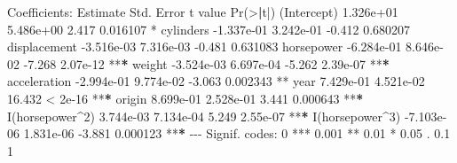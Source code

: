 \documentclass[
]{article}
\newenvironment{Shaded}{\begin{snugshade}}{\end{snugshade}}
\newcommand{\DecValTok}[1]{\textcolor[rgb]{0.00,0.00,0.81}{#1}}
\newcommand{\ErrorTok}[1]{\textcolor[rgb]{0.64,0.00,0.00}{\textbf{#1}}}
\newcommand{\FloatTok}[1]{\textcolor[rgb]{0.00,0.00,0.81}{#1}}
\newcommand{\FunctionTok}[1]{\textcolor[rgb]{0.00,0.00,0.00}{#1}}
\newcommand{\NormalTok}[1]{#1}
\newcommand{\SpecialCharTok}[1]{\textcolor[rgb]{0.00,0.00,0.00}{#1}}
\newcommand{\StringTok}[1]{\textcolor[rgb]{0.31,0.60,0.02}{#1}}
\begin{document}
\begin{Shaded}
\begin{Highlighting}[]
\NormalTok{Coefficients}\SpecialCharTok{:}
\NormalTok{                  Estimate Std. Error t value }\FunctionTok{Pr}\NormalTok{(}\SpecialCharTok{\textgreater{}}\ErrorTok{|}\NormalTok{t}\SpecialCharTok{|}\NormalTok{)    }
\NormalTok{(Intercept)      }\FloatTok{1.326e+01}  \FloatTok{5.486e+00}   \FloatTok{2.417} \FloatTok{0.016107} \SpecialCharTok{*}  
\NormalTok{cylinders       }\SpecialCharTok{{-}}\FloatTok{1.337e{-}01}  \FloatTok{3.242e{-}01}  \SpecialCharTok{{-}}\FloatTok{0.412} \FloatTok{0.680207}    
\NormalTok{displacement    }\SpecialCharTok{{-}}\FloatTok{3.516e{-}03}  \FloatTok{7.316e{-}03}  \SpecialCharTok{{-}}\FloatTok{0.481} \FloatTok{0.631083}    
\NormalTok{horsepower      }\SpecialCharTok{{-}}\FloatTok{6.284e{-}01}  \FloatTok{8.646e{-}02}  \SpecialCharTok{{-}}\FloatTok{7.268} \FloatTok{2.07e{-}12} \SpecialCharTok{**}\ErrorTok{*}
\NormalTok{weight          }\SpecialCharTok{{-}}\FloatTok{3.524e{-}03}  \FloatTok{6.697e{-}04}  \SpecialCharTok{{-}}\FloatTok{5.262} \FloatTok{2.39e{-}07} \SpecialCharTok{**}\ErrorTok{*}
\NormalTok{acceleration    }\SpecialCharTok{{-}}\FloatTok{2.994e{-}01}  \FloatTok{9.774e{-}02}  \SpecialCharTok{{-}}\FloatTok{3.063} \FloatTok{0.002343} \SpecialCharTok{**} 
\NormalTok{year             }\FloatTok{7.429e{-}01}  \FloatTok{4.521e{-}02}  \FloatTok{16.432}  \SpecialCharTok{\textless{}} \FloatTok{2e{-}16} \SpecialCharTok{**}\ErrorTok{*}
\NormalTok{origin           }\FloatTok{8.699e{-}01}  \FloatTok{2.528e{-}01}   \FloatTok{3.441} \FloatTok{0.000643} \SpecialCharTok{**}\ErrorTok{*}
\FunctionTok{I}\NormalTok{(horsepower}\SpecialCharTok{\^{}}\DecValTok{2}\NormalTok{)  }\FloatTok{3.744e{-}03}  \FloatTok{7.134e{-}04}   \FloatTok{5.249} \FloatTok{2.55e{-}07} \SpecialCharTok{**}\ErrorTok{*}
\FunctionTok{I}\NormalTok{(horsepower}\SpecialCharTok{\^{}}\DecValTok{3}\NormalTok{) }\SpecialCharTok{{-}}\FloatTok{7.103e{-}06}  \FloatTok{1.831e{-}06}  \SpecialCharTok{{-}}\FloatTok{3.881} \FloatTok{0.000123} \SpecialCharTok{**}\ErrorTok{*}
\SpecialCharTok{{-}{-}{-}}
\NormalTok{Signif. codes}\SpecialCharTok{:}  \DecValTok{0} \StringTok{\textquotesingle{}***\textquotesingle{}} \FloatTok{0.001} \StringTok{\textquotesingle{}**\textquotesingle{}} \FloatTok{0.01} \StringTok{\textquotesingle{}*\textquotesingle{}} \FloatTok{0.05} \StringTok{\textquotesingle{}.\textquotesingle{}} \FloatTok{0.1} \StringTok{\textquotesingle{} \textquotesingle{}} \DecValTok{1}


\end{Highlighting}
\end{Shaded}
\end{document}
